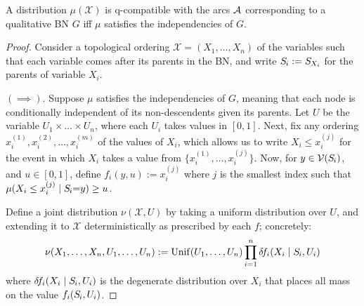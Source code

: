 \documentclass{article}
\newcommand{\Pa}{\mathop{\mathbf{Pa}}}
\newcommand{\X}{\mathcal X}
\begin{document}
\begin{prop}
    A distribution $\mu(\X)$ is q-compatible with the arcs $\mathcal A$ corresponding to a qualitative BN $G$ iff $\mu$ satisfies the independencies of $G$. 
\end{prop}
\begin{proof}
    Consider a topological ordering $\X = (X_1, \ldots, X_n)$ of the variables such that each variable comes after its parents in the BN, and write $\Src i := \Src {X_i}$ for the parents of variable $X_i$. 
    
    $(\implies)$. 
    Suppose $\mu$ satisfies the independencies of $G$, meaning that each 
    node is conditionally independent of its non-descendents given its parents. 
    Let $U$ be the variable $U_1 \times \ldots \times U_n$, where each $U_i$ takes values in $[0,1]$. 
    Next, fix any ordering 
    $x^{(1)}_i, x^{(2)}_i,  \ldots, x_i^{(m)}$ of the values of $X_i$, 
    which allows us to write
    $X_i \le x_i^{(j)}$ for the event in which $X_i$ takes a value from
        $\{ x_i^{(1)}, \ldots, x_i^{(j)}\}$. 
    Now, for $y \in \V(\Src i)$, and $u \in [0,1]$, 
    define $f_i(y, u) := x_i^{(j)}$ where $j$ is the smallest index 
    such that $\mu(X_i \le x_i^{(j)} \mid \Src i {=} y) \ge u$.
    
    Define a joint distribution $\nu(\X, U)$ by taking a uniform distribution over $U$, and extending it to $\X$ deterministically as prescribed by each $f$; concretely:
    \[
        \nu(X_1, \ldots, X_n, U_1, \ldots, U_n) := 
            \mathrm{Unif}(U_1, \ldots, U_n)
            \prod_{i = 1}^n
            \delta \! f_i (X_i \mid \Src i, U_i)
    \]
    where $\delta \! f_i (X_i \mid \Src i, U_i)$ is the degenerate distribution over $X_i$ that places all mass on the value $f_i(\Src i, U_i)$.
    

\end{proof}
\end{document}
